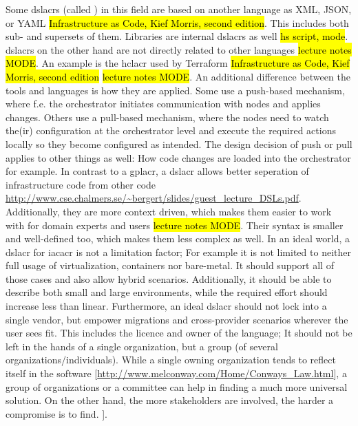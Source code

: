 \newline
Some \gls{dslacr}s (called ) in this field are based on another language as XML, JSON, or YAML \hl{Infrastructure as Code, Kief Morris, second edition}. This includes both sub- and supersets of them. Libraries are internal \gls{dslacr}s as well \hl{hs script, mode}.  \gls{dslacr}s on the other hand are not directly related to other languages \hl{lecture notes MODE}. An example is the \gls{hclacr} used by Terraform \hl{Infrastructure as Code, Kief Morris, second edition} \hl{lecture notes MODE}.
\newline
An additional difference between the tools and languages is how they are applied. Some use a push-based mechanism, where f.e. the orchestrator initiates communication with nodes and applies changes. Others use a pull-based mechanism, where the nodes need to watch the(ir) configuration at the orchestrator level and execute the required actions locally so they become configured as intended. The design decision of push or pull applies to other things as well: How code changes are loaded into the orchestrator for example.
\newline
In contrast to a \gls{gplacr}, a \gls{dslacr} allows better seperation of infrastructure code from other code \url{http://www.cse.chalmers.se/~bergert/slides/guest_lecture_DSLs.pdf}. Additionally, they are more context driven, which makes them easier to work with for domain experts and users \hl{lecture notes MODE}. Their syntax is smaller and well-defined too, which makes them less complex as well.
\newline
In an ideal world, a \gls{dslacr} for \gls{iacacr} is not a limitation factor; For example it is not limited to neither full usage of virtualization, containers nor bare-metal. It should support all of those cases and also allow hybrid scenarios. Additionally, it should be able to describe both small and large environments, while the required effort should increase less than linear. Furthermore, an ideal \gls{dslacr} should not lock into a single vendor, but empower migrations and cross-provider scenarios wherever the user sees fit. This includes the licence and owner of the language; It should not be left in the hands of a single organization, but a group (of several organizations/individuals). While a single owning organization tends to reflect itself in the software [\url{http://www.melconway.com/Home/Conways_Law.html}], a group of organizations or a committee can help in finding a much more universal solution. On the other hand, the more stakeholders are involved, the harder a compromise is to find.
].

